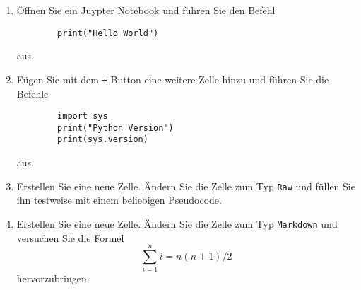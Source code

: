 \begin{enumerate}
	\item Öffnen Sie ein Juypter Notebook und führen Sie den Befehl
	\begin{verbatim}
		print("Hello World")
	\end{verbatim}
	aus.
	\item Fügen Sie mit dem \verb|+|-Button eine weitere Zelle hinzu und führen Sie die Befehle
	\begin{verbatim}
		import sys
		print("Python Version")
		print(sys.version)
	\end{verbatim}
	aus.
	\item Erstellen Sie eine neue Zelle. Ändern Sie die Zelle zum Typ \verb|Raw| und füllen Sie ihn testweise mit einem beliebigen Pseudocode.
	\item  Erstellen Sie eine neue Zelle. Ändern Sie die Zelle zum Typ \verb|Markdown| und versuchen Sie die Formel
	$$
		\sum_{i=1}^n i = n(n+1)/2
	$$
	hervorzubringen.
\end{enumerate}